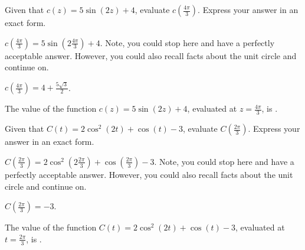 \begin{shuffle}
\begin{exercise}
Given that $c(z)=5 \sin (2 z)+4$, evaluate $c\left(\frac{4 \pi }{3}\right)$. Express your answer in an exact form.
\begin{solution}
\begin{hint}
$c\left(\frac{4 \pi }{3}\right)=5 \sin \left(2 \frac{4 \pi }{3}\right)+4$. Note, you could stop here and have a perfectly acceptable answer. However, you could also recall facts about the unit circle and continue on. 
\end{hint}
\begin{hint}
$c\left(\frac{4 \pi }{3}\right)=4+\frac{5 \sqrt{3}}{2}$.
\end{hint}
The value of the function $c(z)=5 \sin (2 z)+4$, evaluated at $z=\frac{4 \pi }{3}$, is .
\end{solution}
\end{exercise}

\begin{exercise}
Given that $C(t)=2 \cos ^2(2 t)+\cos (t)-3$, evaluate $C\left(\frac{2 \pi }{3}\right)$. Express your answer in an exact form.
\begin{solution}
\begin{hint}
$C\left(\frac{2 \pi }{3}\right)=2 \cos ^2\left(2 \frac{2 \pi }{3}\right)+\cos \left(\frac{2 \pi }{3}\right)-3$. Note, you could stop here and have a perfectly acceptable answer. However, you could also recall facts about the unit circle and continue on. 
\end{hint}
\begin{hint}
$C\left(\frac{2 \pi }{3}\right)=-3$.
\end{hint}
The value of the function $C(t)=2 \cos ^2(2 t)+\cos (t)-3$, evaluated at $t=\frac{2 \pi }{3}$, is .
\end{solution}
\end{exercise}
\end{shuffle}


